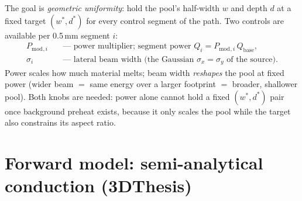 \documentclass[11pt]{article}
\newcommand{\Pmod}{P_{\mathrm{mod}}}
\begin{document}
The goal is \emph{geometric uniformity}: hold the pool's half-width $w$ and
depth $d$ at a fixed target $(w^\ast, d^\ast)$ for every control segment of
the path. Two controls are available per 0.5\,mm segment $i$:
\begin{align*}
  \Pmod{}_{,i} &\quad\text{--- power multiplier; segment power } Q_i = \Pmod{}_{,i}\, Q_{\mathrm{base}},\\
  \sigma_i     &\quad\text{--- lateral beam width (the Gaussian $\sigma_x=\sigma_y$ of the source).}
\end{align*}
Power scales how much material melts; beam width \emph{reshapes} the pool at
fixed power (wider beam $=$ same energy over a larger footprint $=$ broader,
shallower pool). Both knobs are needed: power alone cannot hold a fixed
$(w^\ast,d^\ast)$ pair once background preheat exists, because it only scales
the pool while the target also constrains its aspect ratio.

\section{Forward model: semi-analytical conduction (3DThesis)}
\label{sec:forward}
\end{document}
